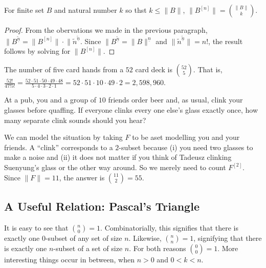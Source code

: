 \begin{lemma}
	For finite set $B$ and natural number $k$ so thst $k\leq \lVert B\rVert$,
	$\lVert B^{[n]}\rVert = \binom{\lVert B\rVert}{k}$.
	
	\begin{proof}
		From the obervations we made in the previous paragraph, 
		$\lVert B^{\underline{\tilde{n}}} = \lVert B^{[n]}\rVert\cdot \lVert \tilde{n}^{\underline{\tilde{n}}}$. Since $\lVert B^{\underline{\tilde{n}}}=\lVert B\rVert^{\underline n}$ and $\lVert \tilde{n}^{\underline{\tilde{n}}}\rVert = n!$, the result follows by solving for $\lVert B^{[n]}\rVert$.
	\end{proof}	
\end{lemma}


\begin{example}
	The number of five card hands from a $52$ card deck is $\binom{52}{5}$. That is,
	$\frac{52!}{47!5!}=\frac{52\cdot51\cdot50\cdot49\cdot48}{5\cdot4\cdot3\cdot2\cdot1} = 52\cdot51\cdot10\cdot49\cdot2 = 2,598,960$.
\end{example}

\begin{example}
	At a pub, you and a group of $10$ friends order beer and, as usual, clink your glasses before quaffing. If everyone clinks every one else's glass exactly once, how many separate clink sounds should you hear?
	
	We can model the situation by taking $F$ to be aset modelling you and your friends. A ``clink'' corresponds to a $2$-subset because (i) you need two glasses to make a noise and (ii) it does not matter if you think of Tadeusz clinking Suenyung's glass or the other way around. So we merely need to count $F^{[2]}$. Since $\lVert F\rVert = 11$, the answer is $\binom{11}{2}=55$. 
\end{example}

\subsection{A Useful Relation: Pascal's Triangle}

It is easy to see that $\binom{n}0 = 1$. 
Combinatorially, this signifies that there is exactly one $0$-subset of any set of size $n$. 
Likewise,
$\binom{n}{n} = 1$, signifying that there is exactly one $n$-subset of a set of size $n$.
For both reasons $\binom00 = 1$.
More interesting things occur in between, when $n>0$ and $0<k<n$.

